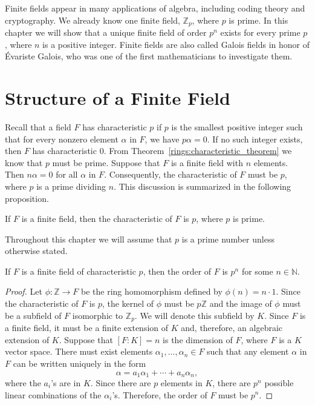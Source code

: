 

Finite fields appear in many applications of algebra, including coding theory and cryptography.  We already know one finite field, ${\mathbb Z}_p$, where $p$ is prime.  In this chapter we will show that a unique finite field of order $p^n$ exists for every prime $p$, where $n$ is a positive integer.  Finite fields are also called Galois fields in honor of \'{E}variste Galois, who was one of the first mathematicians to
investigate them.

 
\section{Structure of a Finite Field}

Recall that a field $F$ has {\bfi characteristic} $p$ if $p$ is the smallest positive integer such that for every nonzero element $\alpha$ in $F$, we have $p \alpha = 0$.  If no such integer exists, then $F$ has characteristic 0.  From Theorem~\ref{rings:characteristic_theorem} we know that $p$ must be prime.  Suppose that $F$ is a finite field with $n$ elements. Then $n \alpha = 0$ for all $\alpha$ in $F$.  Consequently, the characteristic of $F$ must be $p$, where $p$ is a prime dividing $n$.  This discussion is summarized in the following proposition.   

\begin{proposition}
If $F$ is a finite field, then the characteristic of $F$ is $p$, where $p$ is prime.
\end{proposition}

Throughout this chapter we will assume that $p$ is a prime number unless otherwise stated.  

\begin{proposition}
If $F$ is a finite field of characteristic $p$, then the order of $F$ is $p^n$ for some $n \in {\mathbb N}$.   
\end{proposition}

\begin{proof}
Let $\phi : {\mathbb Z} \rightarrow F$ be the ring homomorphism defined by $\phi(n) = n \cdot 1$.  Since the characteristic of $F$ is $p$, the kernel of $\phi$ must be $p {\mathbb Z}$ and the image of $\phi$ must be a subfield of $F$ isomorphic to ${\mathbb Z}_p$.  We will denote this subfield by $K$.  Since $F$ is a finite field, it must be a finite extension of $K$ and, therefore, an algebraic extension of $K$. Suppose that $[F : K] = n$ is the dimension of $F$, where $F$ is a $K$ vector space.  There must exist elements $\alpha_1, \ldots, \alpha_n \in F$ such that any element $\alpha$ in $F$ can be written uniquely in the form   
\[
\alpha = a_1 \alpha_1 + \cdots + a_n \alpha_n,
\]
where the $a_i$'s are in $K$.  Since there are $p$ elements in $K$, there are $p^n$ possible linear combinations of the $\alpha_i$'s.  Therefore, the order of $F$ must be $p^n$.  
\end{proof}


